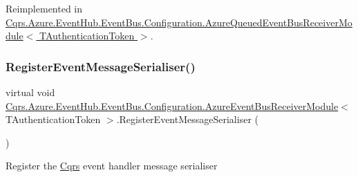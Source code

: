 Reimplemented in \hyperlink{classCqrs_1_1Azure_1_1EventHub_1_1EventBus_1_1Configuration_1_1AzureQueuedEventBusReceiverModule_a419dbe60e08be1bbf29b875cb1f121d0}{Cqrs.\+Azure.\+Event\+Hub.\+Event\+Bus.\+Configuration.\+Azure\+Queued\+Event\+Bus\+Receiver\+Module$<$ T\+Authentication\+Token $>$}.

\mbox{\label{classCqrs_1_1Azure_1_1EventHub_1_1EventBus_1_1Configuration_1_1AzureEventBusReceiverModule_aa66b1894a9647b338a0a3a809c5f270f}} 
\subsubsection{\texorpdfstring{Register\+Event\+Message\+Serialiser()}{RegisterEventMessageSerialiser()}}
{\footnotesize\ttfamily virtual void \hyperlink{classCqrs_1_1Azure_1_1EventHub_1_1EventBus_1_1Configuration_1_1AzureEventBusReceiverModule}{Cqrs.\+Azure.\+Event\+Hub.\+Event\+Bus.\+Configuration.\+Azure\+Event\+Bus\+Receiver\+Module}$<$ T\+Authentication\+Token $>$.Register\+Event\+Message\+Serialiser (\begin{DoxyParamCaption}{ }\end{DoxyParamCaption})\hspace{0.3cm}{\ttfamily [virtual]}}



Register the \hyperlink{namespaceCqrs}{Cqrs} event handler message serialiser 

